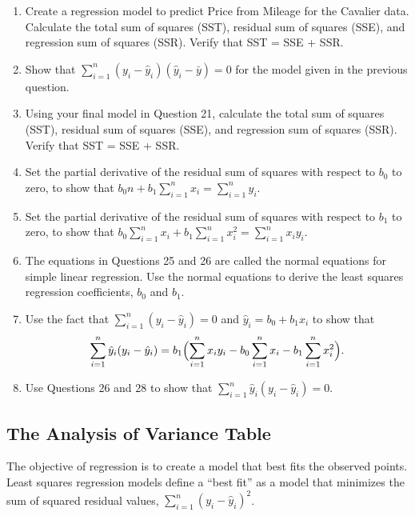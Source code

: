 \documentclass[
]{report}
\providecommand{\tightlist}{%
  \setlength{\itemsep}{0pt}\setlength{\parskip}{0pt}}
\theoremstyle{definition}
\theoremstyle{definition}
\theoremstyle{definition}
\theoremstyle{definition}
\theoremstyle{remark}
\begin{document}
\begin{enumerate}
\def\labelenumi{\arabic{enumi}.}
\setcounter{enumi}{21}
\tightlist
\item
  Create a regression model to predict Price from Mileage for the Cavalier data. Calculate the total sum of squares (SST), residual sum of squares (SSE), and regression sum of squares (SSR). Verify that SST = SSE + SSR.\\
\item
  Show that \(\sum_{i=1}^n (y_i - \hat{y}_i)(\hat{y}_i - \bar{y}) = 0\) for the model given in the previous question.\\
\item
  Using your final model in Question 21, calculate the total sum of squares (SST), residual sum of squares (SSE), and regression sum of squares (SSR). Verify that SST = SSE + SSR.\\
\item
  Set the partial derivative of the residual sum of squares with respect to \(b_0\) to zero, to show that \(b_0 n + b_1 \sum_{i=1}^n x_i = \sum_{i=1}^n y_i.\)
\item
  Set the partial derivative of the residual sum of squares with respect to \(b_1\) to zero, to show that \(b_0 \sum_{i=1}^n x_i + b_1 \sum_{i=1}^n x_i^2 = \sum_{i=1}^n x_i y_i.\)
\item
  The equations in Questions 25 and 26 are called the normal equations for simple linear regression. Use the normal equations to derive the least squares regression coefficients, \(b_0\) and \(b_1\).\\
\item
  Use the fact that \(\sum_{i=1}^n (y_i - \hat{y}_i) = 0\) and \(\hat{y}_i = b_0 + b_1 x_i\) to show that
  \begin{equation}
  \sum_{i=1}^n \hat{y}_i (y_i - \hat{y}_i)
    = b_1 \Bigl(\sum_{i=1}^n x_i y_i - b_0 \sum_{i=1}^n x_i - b_1 \sum_{i=1}^n x_i^2\Bigr). \notag
  \end{equation}
\item
  Use Questions 26 and 28 to show that \(\sum_{i=1}^n \hat{y}_i (y_i - \hat{y}_i) = 0.\)
\end{enumerate}

\hypertarget{the-analysis-of-variance-table}{%
\subsection{The Analysis of Variance Table}\label{the-analysis-of-variance-table}}

The objective of regression is to create a model that best fits the observed points. Least squares regression models define a ``best fit'' as a model that minimizes the sum of squared residual values, \(\sum_{i=1}^n (y_i - \hat{y}_i)^2\).
\end{document}
